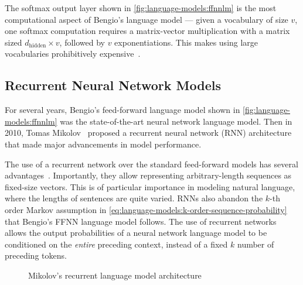 The softmax output layer shown in \autoref{fig:language-models:ffnnlm} is the most computational aspect of Bengio's language model ---
given a vocabulary of size $v$, one softmax computation requires a matrix-vector multiplication with a matrix sized $d_\text{hidden} \times v$, followed by $v$ exponentiations.
This makes using large vocabularies prohibitively expensive~\cite{goldberg_2017}.

\subsection{Recurrent Neural Network Models}\label{sec:language-models:rnns}

For several years, Bengio's feed-forward language model shown in \autoref{fig:language-models:ffnnlm} was the state-of-the-art neural network language model.
Then in 2010, Tomas Mikolov~\cite{Mikolov2010RecurrentNN,Mikolov2011RecurrentNN,Mikolov2012ContextDR} proposed a recurrent neural network (RNN) architecture that made major advancements in model performance.

The use of a recurrent network over the standard feed-forward models has several advantages~\cite{goldberg_2017}.
Importantly, they allow representing arbitrary-length sequences as fixed-size vectors.
This is of particular importance in modeling natural language, where the lengths of sentences are quite varied.
RNNs also abandon the $k$-th order Markov assumption in \autoref{eq:language-models:k-order-sequence-probability} that Bengio's FFNN language model follows.
The use of recurrent networks allows the output probabilities of a neural network language model to be conditioned on the \textit{entire} preceding context, instead of a fixed $k$ number of preceding tokens.

\begin{figure}[h]
    \centering
    \caption{Mikolov's recurrent language model architecture}\label{fig:language-models:rnnlm}
\end{figure}


